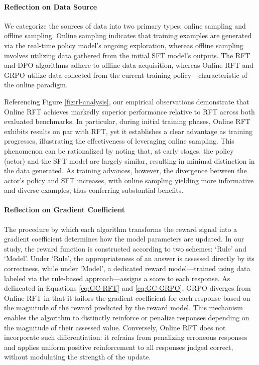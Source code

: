 \paragraph{Reflection on Data Source} We categorize the sources of data into two primary types: online sampling and offline sampling. Online sampling indicates that training examples are generated via the real-time policy model’s ongoing exploration, whereas offline sampling involves utilizing data gathered from the initial SFT model’s outputs. The RFT and DPO algorithms adhere to offline data acquisition, whereas Online RFT and GRPO utilize data collected from the current training policy—characteristic of the online paradigm.

Referencing Figure \ref{fig:rl-analysis}, our empirical observations demonstrate that Online RFT achieves markedly superior performance relative to RFT across both evaluated benchmarks. In particular, during initial training phases, Online RFT exhibits results on par with RFT, yet it establishes a clear advantage as training progresses, illustrating the effectiveness of leveraging online sampling. This phenomenon can be rationalized by noting that, at early stages, the policy (actor) and the SFT model are largely similar, resulting in minimal distinction in the data generated. As training advances, however, the divergence between the actor’s policy and SFT increases, with online sampling yielding more informative and diverse examples, thus conferring substantial benefits.

\paragraph{Reflection on Gradient Coefficient} The procedure by which each algorithm transforms the reward signal into a gradient coefficient determines how the model parameters are updated. In our study, the reward function is constructed according to two schemes: `Rule’ and `Model’. Under `Rule’, the appropriateness of an answer is assessed directly by its correctness, while under `Model’, a dedicated reward model—trained using data labeled via the rule-based approach—assigns a score to each response. As delineated in Equations \ref{eq:GC-RFT} and \ref{eq:GC-GRPO}, GRPO diverges from Online RFT in that it tailors the gradient coefficient for each response based on the magnitude of the reward predicted by the reward model. This mechanism enables the algorithm to distinctly reinforce or penalize responses depending on the magnitude of their assessed value. Conversely, Online RFT does not incorporate such differentiation: it refrains from penalizing erroneous responses and applies uniform positive reinforcement to all responses judged correct, without modulating the strength of the update.

